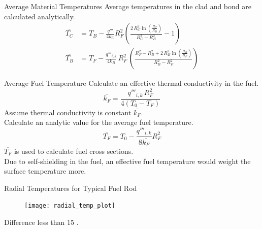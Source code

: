 \begin{frame}{Average Material Temperatures}
  Average temperatures in the clad and bond are calculated analytically.
  \begin{align}
    \label{eq:tc_bar}
    \overline{T_C} &= T_B - \frac{q'''}{4 k_C} R_F^2 \left(
      \frac{2 \, R_C^2 \ln\left(\frac{R_C}{R_B}\right)}
      {R_C^2 - R_B^2}  - 1\right) \\
    \label{eq:tb_bar}
    \overline{T_B} &= T_F - \frac{q'''_{i,k}}{4 k_B} \, R_F^2 \, \left(
      \frac{R_F^2 - R_B^2 + 2\,R_B^2 \ln\left(\frac{R_B}{R_F}\right)}
      {R_B^2-R_F^2}\right)
  \end{align}
\end{frame}

\begin{frame}{Average Fuel Temperature}
  Calculate an effective thermal conductivity in the fuel.
  \begin{equation}
    \label{eq:kfuel_constant}
    \overline{k_F} = \frac{q'''_{i,k} \, R_F^2}{4(T_0-T_F)}
  \end{equation}
  Assume thermal conductivity is constant $\overline{k_F}$.\\
  Calculate an analytic value for the average fuel temperature.
  \begin{equation}
    \label{eq:tf_bar}
    \overline{T_F} = T_0 - \frac{q'''_{i,k}}{8 \overline{k_F}} R_F^2
  \end{equation}
  $\overline{T_F}$ is used to calculate fuel cross sections. \\
  Due to self-shielding in the fuel, an effective fuel temperature would weight
  the surface temperature more.
\end{frame}

\begin{frame}{Radial Temperatures for Typical Fuel Rod}
  \begin{figure}
    \centering
    \texttt{[image: radial\_temp\_plot]}
    \label{fig:radial_temp_plot}
  \end{figure}
  \begin{block}{}
    \centering
    Difference less than 15 .
  \end{block}
\end{frame}

